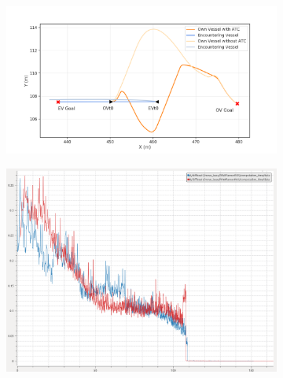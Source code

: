         \begin{figure}[H]
        \centering
        
            \begin{subfigure}[b]{0.49\textwidth}
                \centering
                \includegraphics[width=\textwidth]{figs/Chap5/plot_ho_w_vs_wo.png}
                \caption{}
                \label{fig:plot_ho_w_vs_wo}
            \end{subfigure}
            \begin{subfigure}[b]{0.49\textwidth}
                \centering
                \includegraphics[width=\textwidth]{figs/Chap5/plot_ho_w_vs_wo_CT.png}
                \caption{}
                \label{fig:plot_ho_w_vs_wo_CT}
            \end{subfigure}
            

\end{figure}
